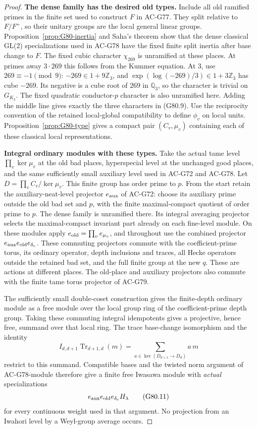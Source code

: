 \begin{proof}
\textbf{The dense family has the desired old types.}
Include all old ramified primes in the finite set used to construct
\(F\) in AC-G77.  They split relative to \(F/F^+\), so their unitary
groups are the local general linear groups.
Proposition~\ref{prop:G80-inertia} and Saha's theorem show that the
dense classical GL(2) specializations used in AC-G78 have the fixed
finite split inertia after base change to \(F\).
The fixed cubic character \(\chi_{269}\) is unramified at these places.
At primes away \(3\cdot269\) this follows from the Kummer equation.
At \(3\), use \(269\equiv-1\pmod9\): \(-269\in1+9\mathbb Z_3\),
and \(\exp(\log(-269)/3)\in1+3\mathbb Z_3\) has cube \(-269\).
Its negative is a cube root of \(269\) in \(\mathbb Q_3\), so the
character is trivial on \(G_{K_3}\).
The fixed quadratic conductor-\(p\) character is also unramified here.  Adding the
middle line gives exactly the three characters in (G80.9).
Use the reciprocity convention of the retained local-global
compatibility to define \(\phi_v\) on local units.
Proposition~\ref{prop:G80-type} gives a compact pair
\((C_v,\mu_v)\) containing each of these classical local representations.

\textbf{Integral ordinary modules with these types.}
Take the actual tame level \(\prod_v\ker\mu_v\) at the old bad places,
hyperspecial level at the unchanged good places, and the same
sufficiently small auxiliary level used in AC-G72 and AC-G78.
Let \(D=\prod_v C_v/\ker\mu_v\).
This finite group has order prime to \(p\).
From the start retain the auxiliary-neat-level projector
\(e_{\rm aux}\) of AC-G72: choose its auxiliary prime outside the old
bad set and \(p\), with the finite maximal-compact quotient of order
prime to \(p\).  The dense family is unramified there.
Its integral averaging projector selects the maximal-compact invariant
part already on each fine-level module.  On these modules apply
\(e_{\rm old}=\prod_v e_{\mu_v}\), and throughout use the combined
projector \(e_{\rm aux}e_{\rm old}e_{\delta_e}\).
These commuting projectors commute with the coefficient-prime torus, its ordinary operator,
depth inclusions and traces, all Hecke operators outside the retained
bad set, and the full finite group at the new \(q\).
These are actions at different places.
The old-place and auxiliary projectors also commute with the finite
tame torus projector of AC-G79.

The sufficiently small double-coset construction gives the finite-depth
ordinary module as a free module over the local group ring of the
coefficient-prime depth group.  Taking these commuting integral
idempotents gives a projective, hence free, summand over that local
ring.  The trace base-change isomorphism and the identity
\[
 I_{d,d+1}\operatorname{Tr}_{d+1,d}(m)
       =\sum_{a\in\ker(D_{d+1}\to D_d)}a\,m        \tag{G80.10}
\]
restrict to this summand.
Compatible bases and the twisted norm argument of AC-G78-module
therefore give a finite free Iwasawa module with \emph{actual}
specializations
\[
 e_{\rm aux}e_{\rm old}e_{\delta_e}H_\lambda                 \tag{G80.11}
\]
for every continuous weight used in that argument.
No projection from an Iwahori level by a Weyl-group average occurs.


\end{proof}
